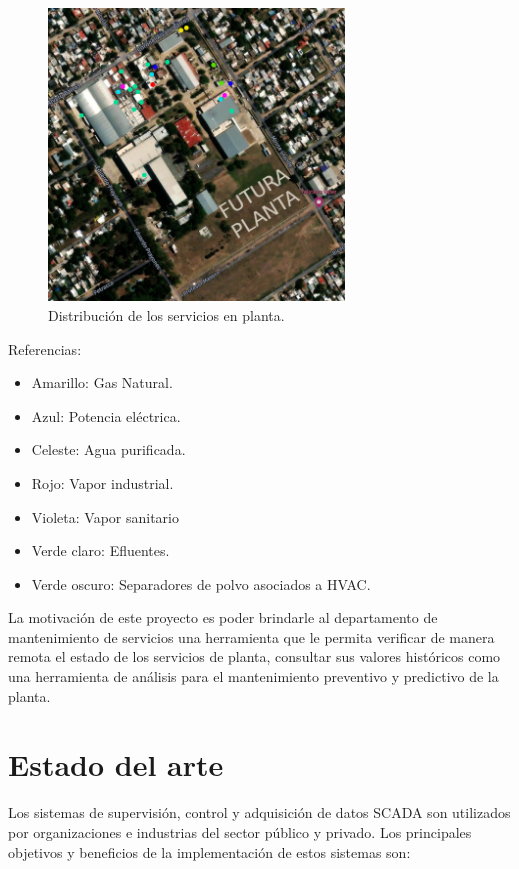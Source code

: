 \begin{figure}[htbp]
	\centering
	\includegraphics[width=0.7\textwidth]{./Figures/ROEMMERS.png}
	\caption{Distribución de los servicios en planta.}
	\label{fig:LG}
\end{figure}
Referencias:
\begin{itemize}
	\item Amarillo: Gas Natural.
	\item Azul: Potencia eléctrica.
	\item Celeste: Agua purificada.
	\item Rojo: Vapor industrial.
	\item Violeta: Vapor sanitario
	\item Verde claro: Efluentes.
	\item Verde oscuro: Separadores de polvo asociados a HVAC.
\end{itemize}

La motivación de este proyecto es poder brindarle al departamento de mantenimiento de servicios una herramienta que le permita verificar de manera remota el estado de los servicios de planta, consultar sus valores históricos como una herramienta de análisis para el mantenimiento preventivo y predictivo de la planta.


\section{Estado del arte}

Los sistemas de supervisión, control y adquisición de datos SCADA son utilizados por organizaciones e industrias del sector público y privado.
Los principales objetivos y beneficios de la implementación de estos sistemas son: 


